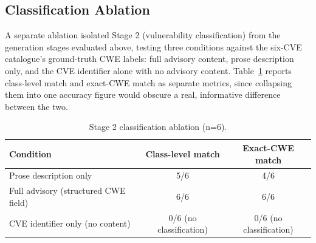 \documentclass[12pt,a4paper]{report}
\begin{document}
\subsection{Classification Ablation}
\label{sec:classification-ablation}

A separate ablation isolated Stage 2 (vulnerability classification) from the generation stages evaluated above, testing three conditions against the six-CVE catalogue's ground-truth CWE labels: full advisory content, prose description only, and the CVE identifier alone with no advisory content. Table~\ref{tab:ablation} reports class-level match and exact-CWE match as separate metrics, since collapsing them into one accuracy figure would obscure a real, informative difference between the two.

\begin{table}[H]
\centering
\caption{Stage 2 classification ablation (n=6).}
\label{tab:ablation}
\begin{tabular}{@{}lcc@{}}
\toprule
\textbf{Condition} & \textbf{Class-level match} & \textbf{Exact-CWE match} \\
\midrule
Prose description only & 5/6 & 4/6 \\
Full advisory (structured CWE field) & 6/6 & 6/6 \\
CVE identifier only (no content) & 0/6 (no classification) & 0/6 (no classification) \\
\bottomrule
\end{tabular}
\end{table}
\end{document}
